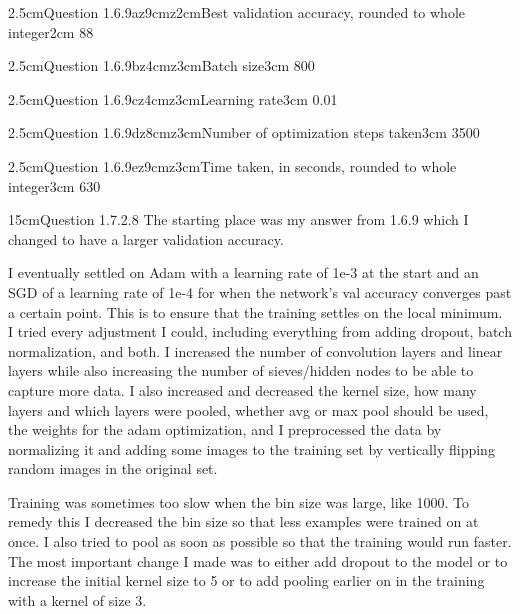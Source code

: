 \documentclass[11pt]{article}
\newcommand{\answertextheight}{5cm}
\newcommand{\answerequationheight}{2.5cm}
\newcounter{QuestionCounter}
\newcounter{SubQuestionCounter}[QuestionCounter]
\newcommand{\newsubquestion}{\stepcounter{SubQuestionCounter}}
\begin{document}
{\begin{answerequation}{\answerequationheight}{Question 1.6.9a}{z{9cm}z{2cm}}{Best validation accuracy, rounded to whole integer}{2cm}
88
\end{answerequation}

\begin{answerequation}{\answerequationheight}{Question 1.6.9b}{z{4cm}z{3cm}}{Batch size}{3cm}
800
\end{answerequation}

\begin{answerequation}{\answerequationheight}{Question 1.6.9c}{z{4cm}z{3cm}}{Learning rate}{3cm}
0.01
\end{answerequation}

\begin{answerequation}{\answerequationheight}{Question 1.6.9d}{z{8cm}z{3cm}}{Number of optimization steps taken}{3cm}
3500
\end{answerequation}

\begin{answerequation}{\answerequationheight}{Question 1.6.9e}{z{9cm}z{3cm}}{Time taken, in seconds, rounded to whole integer}{3cm}
630
\end{answerequation}
\newsubquestion


\renewcommand{\answertextheight}{15cm}
\begin{answertext}{\answertextheight}{Question 1.7.2.8}
The starting place was my answer from 1.6.9 which I changed to have a larger validation accuracy.

I eventually settled on Adam with a learning rate of 1e-3 at the start and an SGD of a learning rate of 1e-4 for when the network's val accuracy converges past a certain point.
This is to ensure that the training settles on the local minimum.
I tried every adjustment I could, including everything from adding dropout, batch normalization, and both.
I increased the number of convolution layers and linear layers while also increasing the number of sieves/hidden nodes to be able to capture more data.
I also increased and decreased the kernel size, how many layers and which layers were pooled, whether avg or max pool should be used, the weights for the adam optimization, and I preprocessed the data by normalizing it and adding some images to the training set by vertically flipping random images in the original set.

Training was sometimes too slow when the bin size was large, like 1000.
To remedy this I decreased the bin size so that less examples were trained on at once.
I also tried to pool as soon as possible so that the training would run faster.
The most important change I made was to either add dropout to the model or to increase the initial kernel size to 5 or to add pooling earlier on in the training with a kernel of size 3.


\end{answertext}}
\end{document}
